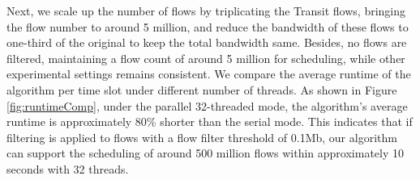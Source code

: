 \begin{table}[tbp]
	\centering
    \vspace{-0.1in}
	\caption{\small Impact of different hyperparameters on algorithm runtime under single threading(ms)}
	\label{fig:runtimeHyper}
\end{table}

Next, we scale up the number of flows by triplicating the Transit flows, bringing the flow number to around 5 million, and reduce the bandwidth of these flows to one-third of the original to keep the total bandwidth same. Besides, no flows are filtered, maintaining a flow count of around 5 million for scheduling, while other experimental settings remains consistent. We compare the average runtime of the algorithm per time slot under different number of threads. As shown in Figure \ref{fig:runtimeComp}, under the parallel 32-threaded mode, the algorithm's average runtime is approximately 80\% shorter than the serial mode. This indicates that if filtering is applied to flows with a flow filter threshold of 0.1Mb, our algorithm can support the scheduling of around 500 million flows within approximately 10 seconds with 32 threads.

